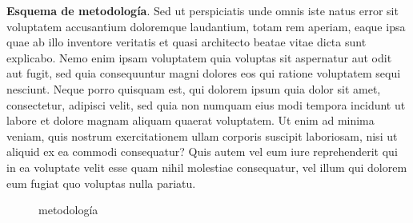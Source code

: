 \documentclass[
  12pt,
  letterpaper,
  DIV=11,
  numbers=noendperiod,
  oneside]{scrreport}
\begin{document}
\newpage

\textbf{Esquema de metodología}. Sed ut perspiciatis unde omnis iste
natus error sit voluptatem accusantium doloremque laudantium, totam rem
aperiam, eaque ipsa quae ab illo inventore veritatis et quasi architecto
beatae vitae dicta sunt explicabo. Nemo enim ipsam voluptatem quia
voluptas sit aspernatur aut odit aut fugit, sed quia consequuntur magni
dolores eos qui ratione voluptatem sequi nesciunt. Neque porro quisquam
est, qui dolorem ipsum quia dolor sit amet, consectetur, adipisci velit,
sed quia non numquam eius modi tempora incidunt ut labore et dolore
magnam aliquam quaerat voluptatem. Ut enim ad minima veniam, quis
nostrum exercitationem ullam corporis suscipit laboriosam, nisi ut
aliquid ex ea commodi consequatur? Quis autem vel eum iure reprehenderit
qui in ea voluptate velit esse quam nihil molestiae consequatur, vel
illum qui dolorem eum fugiat quo voluptas nulla pariatu.

\begin{figure}


\caption{\label{fig-metodologia}metodología}

\end{figure}%
\end{document}
